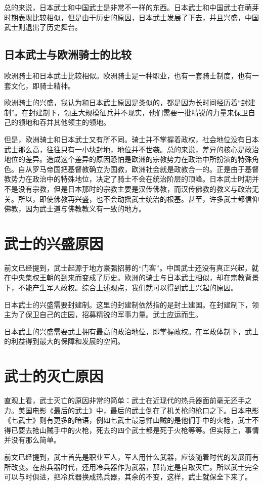\documentclass[utf8]{ctexart}
\begin{document}
总的来说，日本武士和中国武士是非常不一样的东西。日本武士和中国武士在萌芽时期表现比较相似，但是由于历史的原因，日本武士发展了下去，并且兴盛，中国武士则退出了历史舞台。
\subsection{日本武士与欧洲骑士的比较}
欧洲骑士和日本武士比较相似。欧洲骑士是一种职业，也有一套骑士制度，也有一套文化，即骑士精神。

欧洲骑士的兴盛，我认为和日本武士原因是类似的，都是因为长时间经历着“封建制”。在封建制下，领主大规模征兵并不现实，他们需要一批精锐的力量来保卫自己的领地和吞并其他领主的领地。

但是，欧洲骑士和日本武士又有所不同。骑士并不掌握着政权，社会地位没有日本武士那么高，往往只有一小块封地，地位并不世袭\cite{}。总的来说，差异的核心是政治地位的差异。造成这个差异的原因恐怕是欧洲的宗教势力在政治中所扮演的特殊角色。自从罗马帝国把基督教确立为国教，欧洲社会就是政教合一的。正是由于基督教势力在政治中的特殊地位，决定了骑士不会在统治阶层的顶峰。日本武士时期并不是没有宗教，但是日本那时的宗教主要是汉传佛教，而汉传佛教的教义与政治无关。所以，即使佛教再兴盛，也不会动摇武士统治的根基。甚至，许多武士都信仰佛教，因为武士道与佛教教义有一致的地方。

\section{武士的兴盛原因}
前文已经提到，武士起源于地方豪强招募的“门客”。中国武士还没有真正兴起，就在中央集权王朝的到来而变成了历史。欧洲的骑士与日本武士相似，却在宗教背景下，不能产生军人政权。综合上述观点，我们就可以得到武士兴起的原因。

日本武士的兴盛需要封建制。这里的封建制依然指的是封土建国。在封建制下，领主为了保卫自己的庄园，招募精锐的军事力量。武士应运而生。

日本武士的兴盛需要武士拥有最高的政治地位，即掌握政权。在军政体制下，武士的利益得到最大的保障和发展的空间。

\section{武士的灭亡原因}
直观上看，武士灭亡的原因非常的简单：武士在近现代的热兵器面前毫无还手之力。美国电影《最后的武士》中，最后的武士倒在了机关枪的枪口之下。日本电影《七武士》则有更多的暗语，例如七武士最忌惮山贼的是他们手中的火枪，武士不得已要去抢山贼手中的火枪，死去的四个武士都是死于火枪等等。但实际上，事情并没有那么简单。

前文已经提到，武士首先是职业军人，军人用什么武器，应该随着时代的发展而有所改变。在热兵器时代，还用冷兵器作为武器，那肯定是自取灭亡。所以武士完全可以与时俱进，把冷兵器换成热兵器，其余的不变，这样，武士就保全下来了。
\end{document}
